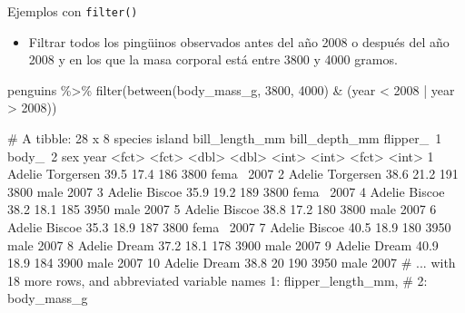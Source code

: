 \documentclass[
  ignorenonframetext,
  aspectratio=169]{beamer}
\newenvironment{Shaded}{\begin{snugshade}}{\end{snugshade}}
\newcommand{\DecValTok}[1]{\textcolor[rgb]{0.00,0.00,0.81}{#1}}
\newcommand{\FunctionTok}[1]{\textcolor[rgb]{0.00,0.00,0.00}{#1}}
\newcommand{\NormalTok}[1]{#1}
\newcommand{\SpecialCharTok}[1]{\textcolor[rgb]{0.00,0.00,0.00}{#1}}
\providecommand{\tightlist}{%
  \setlength{\itemsep}{0pt}\setlength{\parskip}{0pt}}
\let\oldverbatim\verbatim
\let\endoldverbatim\endverbatim
\renewenvironment{verbatim}{\tiny\oldverbatim}{\endoldverbatim}
\begin{document}
\begin{frame}[fragile]{Ejemplos con \texttt{filter()}}
\protect\hypertarget{ejemplos-con-filter-2}{}
\begin{itemize}
\tightlist
\item
  Filtrar todos los pingüinos observados antes del año 2008 o después
  del año 2008 y en los que la masa corporal está entre 3800 y 4000
  gramos.\\
\end{itemize}

\begin{Shaded}
\begin{Highlighting}[]
\NormalTok{penguins }\SpecialCharTok{\%\textgreater{}\%} 
  \FunctionTok{filter}\NormalTok{(}\FunctionTok{between}\NormalTok{(body\_mass\_g, }\DecValTok{3800}\NormalTok{, }\DecValTok{4000}\NormalTok{) }\SpecialCharTok{\&}\NormalTok{ (year }\SpecialCharTok{\textless{}} \DecValTok{2008} \SpecialCharTok{|}\NormalTok{ year }\SpecialCharTok{\textgreater{}} \DecValTok{2008}\NormalTok{))}
\end{Highlighting}
\end{Shaded}

\begin{verbatim}
# A tibble: 28 x 8
   species island    bill_length_mm bill_depth_mm flipper_~1 body_~2 sex    year
   <fct>   <fct>              <dbl>         <dbl>      <int>   <int> <fct> <int>
 1 Adelie  Torgersen           39.5          17.4        186    3800 fema~  2007
 2 Adelie  Torgersen           38.6          21.2        191    3800 male   2007
 3 Adelie  Biscoe              35.9          19.2        189    3800 fema~  2007
 4 Adelie  Biscoe              38.2          18.1        185    3950 male   2007
 5 Adelie  Biscoe              38.8          17.2        180    3800 male   2007
 6 Adelie  Biscoe              35.3          18.9        187    3800 fema~  2007
 7 Adelie  Biscoe              40.5          18.9        180    3950 male   2007
 8 Adelie  Dream               37.2          18.1        178    3900 male   2007
 9 Adelie  Dream               40.9          18.9        184    3900 male   2007
10 Adelie  Dream               38.8          20          190    3950 male   2007
# ... with 18 more rows, and abbreviated variable names 1: flipper_length_mm,
#   2: body_mass_g
\end{verbatim}
\end{frame}
\end{document}
